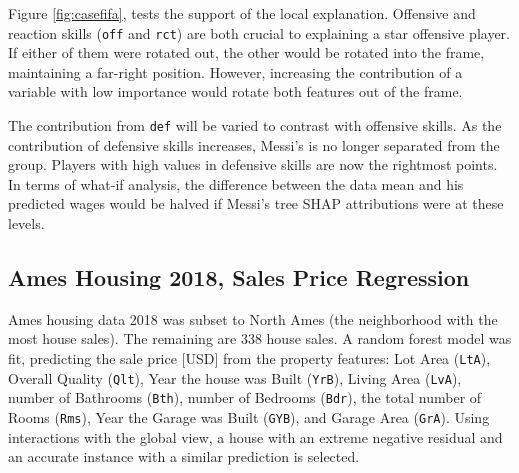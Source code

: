 \documentclass[11pt,twoside]{article}
\begin{document}
Figure \ref{fig:casefifa}, tests the support of the local explanation. Offensive and reaction skills (\texttt{off} and \texttt{rct}) are both crucial to explaining a star offensive player. If either of them were rotated out, the other would be rotated into the frame, maintaining a far-right position. However, increasing the contribution of a variable with low importance would rotate both features out of the frame.

The contribution from \texttt{def} will be varied to contrast with offensive skills. As the contribution of defensive skills increases, Messi's is no longer separated from the group. Players with high values in defensive skills are now the rightmost points. In terms of what-if analysis, the difference between the data mean and his predicted wages would be halved if Messi's tree SHAP attributions were at these levels.

\hypertarget{ames-housing-2018-sales-price-regression}{%
\subsection{Ames Housing 2018, Sales Price Regression}\label{ames-housing-2018-sales-price-regression}}

Ames housing data 2018 was subset to North Ames (the neighborhood with the most house sales). The remaining are 338 house sales. A random forest model was fit, predicting the sale price {[}USD{]} from the property features: Lot Area (\texttt{LtA}), Overall Quality (\texttt{Qlt}), Year the house was Built (\texttt{YrB}), Living Area (\texttt{LvA}), number of Bathrooms (\texttt{Bth}), number of Bedrooms (\texttt{Bdr}), the total number of Rooms (\texttt{Rms}), Year the Garage was Built (\texttt{GYB}), and Garage Area (\texttt{GrA}). Using interactions with the global view, a house with an extreme negative residual and an accurate instance with a similar prediction is selected.
\end{document}
